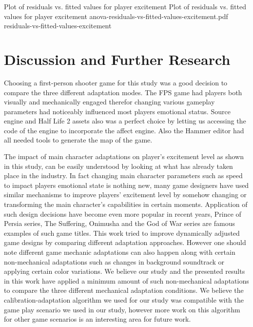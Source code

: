 \documentclass[conference]{IEEEtran}
\begin{document}
\img
{Plot of residuals vs. fitted values for player excitement}
{Plot of residuals vs. fitted values for player excitement}
{anova-residuals-vs-fitted-values-excitement.pdf}
{residuals-vs-fitted-values-excitement}


\section{Discussion and Further Research}
\label{sec:discus}

Choosing a first-person shooter game for this study was a good decision to compare the three different adaptation modes. The FPS game had players both visually and mechanically engaged therefor changing various gameplay parameters had noticeably influenced most players emotional status. Source engine and Half Life 2 assets also was a perfect choice by letting us accessing the code of the engine to incorporate the affect engine. Also the Hammer editor had all needed tools to generate the map of the game.

The impact of main character adaptations on player's excitement level as shown in this study, can be easily understood by looking at what has already taken place in the industry. In fact changing main character parameters such as speed to impact players emotional state is nothing new, many game designers have used similar mechanisms to improve players' excitement level by somehow changing or transforming the main character's capabilities in certain moments. Application of such design decisions have become even more popular in recent years, Prince of Persia series, The Suffering, Onimusha and the God of War series are famous examples of such game titles. This work tried to improve dynamically adjusted game designs by comparing different adaptation approaches. However one should note different game mechanic adaptations can also happen along with certain non-mechanical adaptations such as changes in background soundtrack or applying certain color variations. We believe our study and the presented results in this work have applied a minimum amount of such non-mechanical adaptations to compare the three different mechanical adaptation conditions. We believe the calibration-adaptation algorithm we used for our study was compatible with the game play scenario we used in our study, however more work on this algorithm for other game scenarios is an interesting area for future work.
\end{document}
